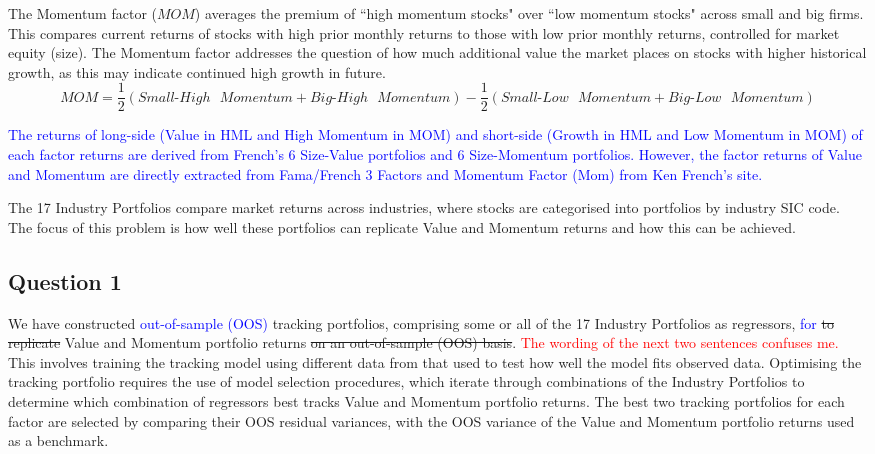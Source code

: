 \documentclass[AER]{AEA}
\begin{document}
\begin{spacing}{2}
The Momentum factor ($MOM$) averages the premium of ``high momentum stocks" over ``low momentum stocks" across small and big firms. This compares current returns of stocks with high prior monthly returns to those with low prior monthly returns, controlled for market equity (size). The Momentum factor addresses the question of how much additional value the market places on stocks with higher historical growth, as this may indicate continued high growth in future.
\begin{equation}
    MOM=\frac{1}{2}(Small\text{-}High\text{ }Momentum+Big\text{-}High\text{ }Momentum)-\frac{1}{2}(Small\text{-}Low\text{ }Momentum+Big\text{-}Low\text{ }Momentum)\label{eq:2}
\end{equation}

\textcolor{blue}{The returns of long-side (Value in HML and High Momentum in MOM) and short-side (Growth in HML and Low Momentum in MOM) of each factor returns are derived from French's 6 Size-Value portfolios and 6 Size-Momentum portfolios. However, the factor returns of Value and Momentum are directly extracted from Fama/French 3 Factors and Momentum Factor (Mom) from Ken French’s site.}

The 17 Industry Portfolios compare market returns across industries, where stocks are categorised into portfolios by industry SIC code. The focus of this problem is how well these portfolios can replicate Value and Momentum returns and how this can be achieved.

\subsection{Question 1}

We have constructed \textcolor{blue}{out-of-sample (OOS)} tracking portfolios, comprising some or all of the 17 Industry Portfolios as regressors, \textcolor{blue}{for} \sout{to replicate} Value and Momentum portfolio returns \sout{on an out-of-sample (OOS) basis}. \textcolor{red}{The wording of the next two sentences confuses me. }This involves training the tracking model using different data from that used to test how well the model fits observed data. Optimising the tracking portfolio requires the use of model selection procedures, which iterate through combinations of the Industry Portfolios to determine which combination of regressors best tracks Value and Momentum portfolio returns. The best two tracking portfolios for each factor are selected by comparing their OOS residual variances, with the OOS variance of the Value and Momentum portfolio returns used as a benchmark.


\end{spacing}
\end{document}
